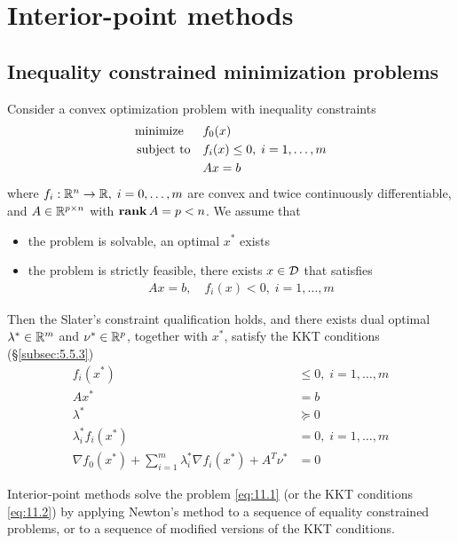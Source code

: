 \chapter{Interior-point methods}

\section{Inequality constrained minimization problems}
Consider a convex optimization problem with inequality constraints
\begin{align}
  \text{minimize\;\;}\quad& f_0(x)\nonumber\\
  \text{subject to}  \quad& f_i(x)\le 0,\;i=1,\dots,m\label{eq:11.1}\\
                          & Ax=b\nonumber
\end{align}
where $f_i:\mathbb{R}^n\rightarrow\mathbb{R},\;i=0,\dots,m$ are convex and twice continuously differentiable, and $A\in\mathbb{R}^{p\times n}$ with $\mathop{\bf rank} A=p<n$.
We assume that
\begin{itemize}
  \item the problem is solvable, \ie an optimal $x^\ast$ exists
  \item the problem is strictly feasible, \ie there exists $x\in\mathcal{D}$ that satisfies
        \begin{align*}
          Ax=b,\quad f_i(x)<0,\;i=1,\dots,m
        \end{align*}
\end{itemize}

Then the Slater's constraint qualification holds, and there exists dual optimal $\lambda^\ast\in\mathbb{R}^m$ and $\nu^\ast\in\mathbb{R}^p$, together with $x^\ast$, satisfy the KKT conditions (\S\ref{subsec:5.5.3})
\begin{align}
  f_i(x^\ast)                &\le     0,\;i=1,\dots,m\nonumber\\
  Ax^\ast                    &=       b\nonumber\\
  \lambda^\ast               &\succeq 0\label{eq:11.2}\\
  \lambda_i^\ast f_i(x^\ast) &=       0,\;i=1,\dots,m\nonumber\\
  \nabla f_0(x^\ast)+\sum_{i=1}^m\lambda_i^\ast\nabla f_i(x^\ast)+A^T\nu^\ast &= 0\nonumber
\end{align}

Interior-point methods solve the problem \eqref{eq:11.1} (or the KKT conditions \eqref{eq:11.2}) by applying Newton's method to a sequence of equality constrained problems, or to a sequence of modified versions of the KKT conditions.
